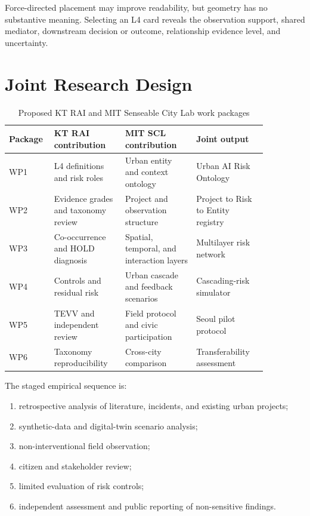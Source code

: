 \documentclass[11pt,a4paper]{article}
\begin{document}
Force-directed placement may improve readability, but geometry has no substantive meaning. Selecting an L4 card reveals the observation support, shared mediator, downstream decision or outcome, relationship evidence level, and uncertainty.

\section{Joint Research Design}

\begin{table}[h]
\centering
\caption{Proposed KT RAI and MIT Senseable City Lab work packages}
\begin{tabular}{p{0.11\linewidth}p{0.25\linewidth}p{0.25\linewidth}p{0.25\linewidth}}
\toprule
Package & KT RAI contribution & MIT SCL contribution & Joint output \\
\midrule
WP1 & L4 definitions and risk roles & Urban entity and context ontology & Urban AI Risk Ontology \\
WP2 & Evidence grades and taxonomy review & Project and observation structure & Project to Risk to Entity registry \\
WP3 & Co-occurrence and HOLD diagnosis & Spatial, temporal, and interaction layers & Multilayer risk network \\
WP4 & Controls and residual risk & Urban cascade and feedback scenarios & Cascading-risk simulator \\
WP5 & TEVV and independent review & Field protocol and civic participation & Seoul pilot protocol \\
WP6 & Taxonomy reproducibility & Cross-city comparison & Transferability assessment \\
\bottomrule
\end{tabular}
\end{table}

The staged empirical sequence is:
\begin{enumerate}
  \item retrospective analysis of literature, incidents, and existing urban projects;
  \item synthetic-data and digital-twin scenario analysis;
  \item non-interventional field observation;
  \item citizen and stakeholder review;
  \item limited evaluation of risk controls;
  \item independent assessment and public reporting of non-sensitive findings.
\end{enumerate}
\end{document}
